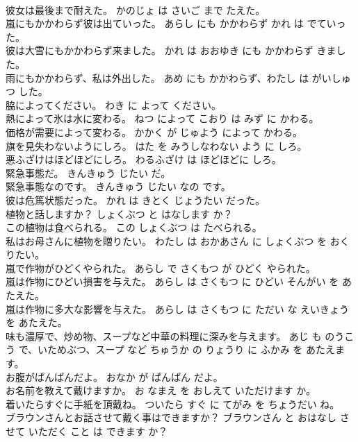 \documentclass[8pt]{extreport}
\begin{document}
\begin{CJK}{UTF8}{min}
\\	彼女は最後まで耐えた。	かのじょ は さいご まで たえた。	
\\	嵐にもかかわらず彼は出ていった。	あらし にも かかわらず かれ は でていった。	
\\	彼は大雪にもかかわらず来ました。	かれ は おおゆき にも かかわらず きました。	
\\	雨にもかかわらず、私は外出した。	あめ にも かかわらず、わたし は がいしゅつ した。	
\\	脇によってください。	わき に よって ください。	
\\	熱によって氷は水に変わる。	ねつ によって こおり は みず に かわる。	
\\	価格が需要によって変わる。	かかく が じゅよう によって かわる。	
\\	旗を見失わないようにしろ。	はた を みうしなわない よう に しろ。	
\\	悪ふざけはほどほどにしろ。	わるふざけ は ほどほどに しろ。	
\\	緊急事態だ。	きんきゅう じたい だ。	
\\	緊急事態なのです。	きんきゅう じたい なの です。	
\\	彼は危篤状態だった。	かれ は きとく じょうたい だった。	
\\	植物と話しますか？	しょくぶつ と はなします か？	
\\	この植物は食べられる。	この しょくぶつ は たべられる。	
\\	私はお母さんに植物を贈りたい。	わたし は おかあさん に しょくぶつ を おくりたい。	
\\	嵐で作物がひどくやられた。	あらし で さくもつ が ひどく やられた。	
\\	嵐は作物にひどい損害を与えた。	あらし は さくもつ に ひどい そんがい を あたえた。	
\\	嵐は作物に多大な影響を与えた。	あらし は さくもつ に ただい な えいきょう を あたえた。	
\\	味も濃厚で、炒め物、スープなど中華の料理に深みを与えます。	あじ も のうこう で、いためぶつ、スープ など ちゅうか の りょうり に ふかみ を あたえます。	
\\	お腹がぱんぱんだよ。	おなか が ぱんぱん だよ。	
\\	お名前を教えて戴けますか。	お なまえ を おしえて いただけます か。	
\\	着いたらすぐに手紙を頂戴ね。	ついたら すぐ に てがみ を ちょうだい ね。	
\\	ブラウンさんとお話させて戴く事はできますか？	ブラウンさん と おはなし させて いただく こと は できます か？	

\end{CJK}
\end{document}
